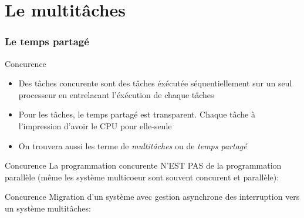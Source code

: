 %                                                                                                               
%
%

\part{Le multitâches}

\section{Le temps partagé}

\begin{frame}{Concurence}
  \begin{itemize}
  \item   Des    tâches   concurente   sont    des   tâches   éxécutée
    séquentiellement sur un seul processeur en entrelacant l'éxécution
    de chaque tâches
  \item  Pour les tâches,  le temps  partagé est  transparent.  Chaque
    tâche à l'impression d'avoir le CPU pour elle-seule
  \item  On  trouvera aussi  les  terme  de  \emph{multitâches} ou  de
    \emph{temps partagé}
  \end{itemize}
\end{frame} 

\begin{frame}{Concurence}
   La programmation concurente N'EST  PAS de la programmation parallèle
  (même les système multicoeur sont souvent concurent et parallèle):
  \begin{center}
  \end{center}
\end{frame}

\begin{frame}{Concurence}
  Migration d'un système avec gestion asynchrone des interruption vers
  un système multitâches:
  \begin{center}
  \end{center}
\end{frame} 

